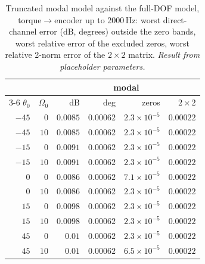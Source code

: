 \documentclass[10pt,a4paper]{article}
\numberwithin{equation}{section}
\begin{document}
\begin{table}[H]\centering\small\setlength{\tabcolsep}{4pt}
\caption{Truncated modal model against the full-DOF model, torque$\to$encoder up to 2000\,Hz: worst direct-channel error (dB, degrees) outside the zero bands, worst relative error of the excluded zeros, worst relative 2-norm error of the $2\times2$ matrix. \emph{Result from placeholder parameters.}}\label{tab:modal_vs_full}
\begin{tabular}{rrrrrr}\toprule
& & \multicolumn{4}{c}{modal} \\ \cmidrule(lr){3-6}
$\theta_0$ & $\Omega_0$ & dB & deg & zeros & $2\times2$ \\ \midrule
$-45$ & $0$ & $0.0085$ & $0.00062$ & $2.3\times10^{-5}$ & $0.00022$ \\
$-45$ & $10$ & $0.0085$ & $0.00062$ & $2.3\times10^{-5}$ & $0.00022$ \\
$-15$ & $0$ & $0.0091$ & $0.00062$ & $2.3\times10^{-5}$ & $0.00022$ \\
$-15$ & $10$ & $0.0091$ & $0.00062$ & $2.3\times10^{-5}$ & $0.00022$ \\
$0$ & $0$ & $0.0086$ & $0.00062$ & $7.1\times10^{-5}$ & $0.00022$ \\
$0$ & $10$ & $0.0086$ & $0.00062$ & $2.3\times10^{-5}$ & $0.00022$ \\
$15$ & $0$ & $0.0098$ & $0.00062$ & $2.3\times10^{-5}$ & $0.00022$ \\
$15$ & $10$ & $0.0098$ & $0.00062$ & $2.3\times10^{-5}$ & $0.00022$ \\
$45$ & $0$ & $0.01$ & $0.00062$ & $2.3\times10^{-5}$ & $0.00022$ \\
$45$ & $10$ & $0.01$ & $0.00062$ & $6.5\times10^{-5}$ & $0.00022$ \\
\bottomrule\end{tabular}\end{table}
\end{document}

